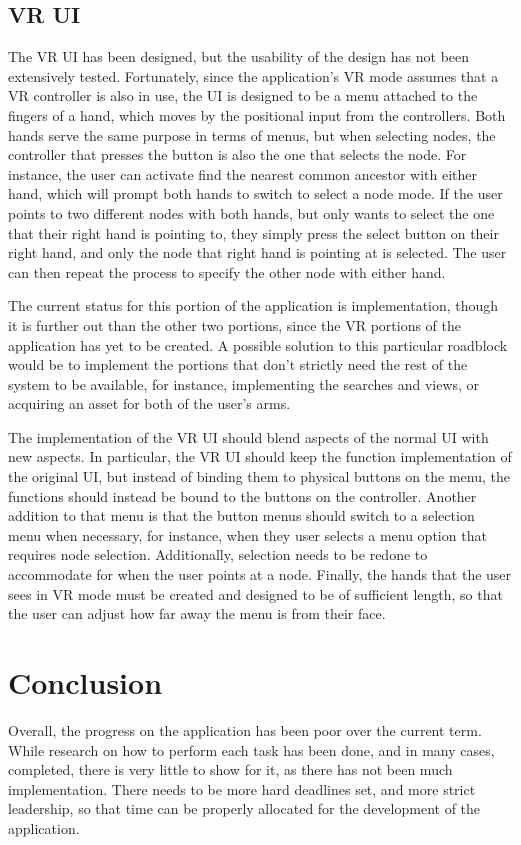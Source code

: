 \documentclass[onecolumn, draftclsnofoot, 10pt, compsoc]{IEEEtran}
\begin{document}
\subsection{VR UI}
\begin{singlespace}
The VR UI has been designed, but the usability of the design has not been extensively tested. Fortunately, since the application's VR mode assumes that a VR controller is also in use, the UI is designed to be a menu attached to the fingers of a hand, which moves by the positional input from the controllers. Both hands serve the same purpose in terms of menus, but when selecting nodes, the controller that presses the button is also the one that selects the node. For instance, the user can activate find the nearest common ancestor with either hand, which will prompt both hands to switch to select a node mode. If the user points to two different nodes with both hands, but only wants to select the one that their right hand is pointing to, they simply press the select button on their right hand, and only the node that right hand is pointing at is selected. The user can then repeat the process to specify the other node with either hand.

The current status for this portion of the application is implementation, though it is further out than the other two portions, since the VR portions of the application has yet to be created. A possible solution to this particular roadblock would be to implement the portions that don't strictly need the rest of the system to be available, for instance, implementing the searches and views, or acquiring an asset for both of the user's arms.

The implementation of the VR UI should blend aspects of the normal UI with new aspects. In particular, the VR UI should keep the function implementation of the original UI, but instead of binding them to physical buttons on the menu, the functions should instead be bound to the buttons on the controller. Another addition to that menu is that the button menus should switch to a selection menu when necessary, for instance, when they user selects a menu option that requires node selection. Additionally, selection needs to be redone to accommodate for when the user points at a node. Finally, the hands that the user sees in VR mode must be created and designed to be of sufficient length, so that the user can adjust how far away the menu is from their face.
\end{singlespace}

\section{Conclusion }
\begin{singlespace}
Overall, the progress on the application has been poor over the current term. While research on how to perform each task has been done, and in many cases, completed, there is very little to show for it, as there has not been much implementation. There needs to be more hard deadlines set, and more strict leadership, so that time can be properly allocated for the development of the application.
\end{singlespace}
\end{document}
